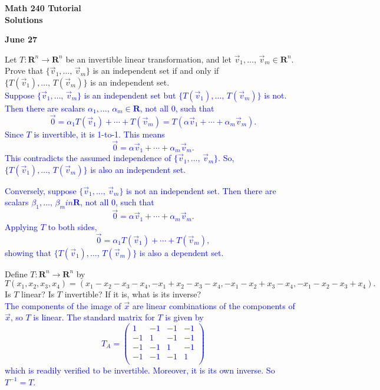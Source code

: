 \documentclass[a4paper,11pt]{article}
\newcommand{\R}{\mathbf{R}}
\newcommand{\BB}[1]{\textcolor{blue}{#1}}
\begin{document}
\begin{center}
  {\Large\bfseries Math 240 Tutorial \\ Solutions}
\end{center}
\begin{center}
  {\bfseries June 27}
\end{center}

 Let $T : \R^n \rightarrow \R^n$ be an invertible
linear transformation, and let $\vec v_1,\dots,\,\vec v_m \in \R^n$. Prove
that $\{\vec v_1,\dots,\,\vec v_m\}$ is an independent set if and only if
$\{T(\vec v_1),\dots,\,T(\vec v_m)\}$ is an independent set. \\

\BB{Suppose $\{\vec v_1,\dots,\,\vec v_m\}$ is an independent set but $\{T(\vec
  v_1),\dots,\,T(\vec v_m)\}$ is not. Then there are scalars
  $\alpha_1,\dots,\,\alpha_m \in \R$, not all 0, such that
  \[
    \vec 0 = \alpha_1T(\vec v_1) + \cdots + T(\vec v_m) = T(\alpha\vec
    v_1+\cdots+\alpha_m\vec v_m).
  \]
  Since $T$ is invertible, it is 1-to-1. This means
  \[
    \vec 0 = \alpha\vec v_1+\cdots+\alpha_m\vec v_m.
  \]
  This contradicts the assumed independence of $\{\vec v_1,\dots,\,\vec v_m\}$.
  So, $\{T(\vec v_1),\dots,\,T(\vec v_m)\}$ is also an independent set.}

\BB{Conversely, suppose $\{\vec v_1,\dots,\,\vec v_m\}$ is not an independent
  set. Then there are scalars $\beta_1,\dots,\,\beta_m in \R$, not all 0, such
  that
  \[
    \vec 0 = \alpha\vec v_1+\cdots+\alpha_m\vec v_m.
  \]
  Applying $T$ to both sides,
  \[
    \vec 0 = \alpha_1T(\vec v_1) + \cdots + T(\vec v_m),
  \]
  showing that $\{T(\vec v_1),\dots,\,T(\vec v_m)\}$ is also a dependent set. \\}

 Define $T : \R^n \rightarrow \R^n$ by
\[
  T(x_1,x_2,x_3,x_4) =
  (x_1-x_2-x_3-x_4, -x_1+x_2-x_3-x_4,-x_1-x_2+x_3-x_4,-x_1-x_2-x_3+x_4).
\]
Is $T$ linear? Is $T$ invertible? If it is, what is its inverse? \\

\BB{The components of the image of $\vec x$ are linear combinations of the
  components of $\vec x$, so $T$ is linear. The standard matrix for $T$ is given
  by
  \[
    T_A = 
    \left(
      \begin{array}{rrrr}
        1 & -1 & -1 & -1 \\
        -1 & 1 & -1 & -1 \\
        -1 & -1 & 1 & -1 \\
        -1 & -1 & -1 & 1 \\
      \end{array}
    \right)
  \]
  which is readily verified to be invertible. Moreover, it is its own inverse.
  So $T^{-1}=T$. \\
}
\end{document}
